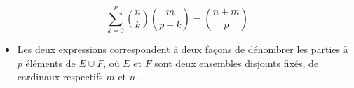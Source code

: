 $$\sum_{k = 0}^{p} \binom{n}{k} \binom{m}{p-k} = \binom{n + m}{p}$$

\begin{itemize}
    \item Les deux expressions correspondent à deux façons de dénombrer les parties à $p$ éléments de $E \cup F$, où $E$ et $F$ sont deux ensembles disjoints fixés, de cardinaux respectifs $m$ et $n$. 
\end{itemize}